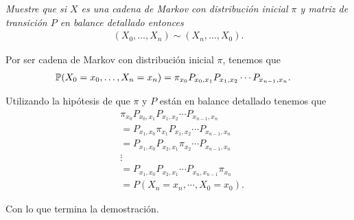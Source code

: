 \emph{
    Muestre que si $X$ es una cadena de Markov con distribución inicial $\pi$ y matriz de transición $P$ en balance detallado entonces
    \begin{align}
            (X_0, \dots, X_n) \sim (X_n, \dots, X_0).
    \end{align}
}

\afterstatement\pn

Por ser cadena de Markov con distribución inicial $\pi$, tenemos que
\begin{align}
        \P(X_0 = x_0, \dots, X_n = x_n) &=  \pi_{x_0} P_{x_0, x_1} P_{x_1, x_2} \cdots P_{x_{n-1}, x_{n}}.
\end{align}\pn

Utilizando la hipótesis de que $\pi$ y $P$ están en balance detallado tenemos que
\begin{align}
    &   \pi_{x_0} P_{x_0, x_1} P_{x_1, x_2} \cdots P_{x_{n-1}, x_{n}}   \\
    &=  P_{x_1, x_0} \pi_{x_1} P_{x_1, x_2} \cdots P_{x_{n-1}, x_{n}}   \\
    &=  P_{x_1, x_0} P_{x_2, x_1} \pi_{x_2} \cdots P_{x_{n-1}, x_{n}}   \\
    &\vdots                                                             \\
    &=  P_{x_1, x_0} P_{x_2, x_1} \cdots P_{x_{n}, x_{n-1}} \pi_{x_n}   \\
    &= P(X_n = x_n, \cdots, X_0 = x_0).
\end{align}\pn

Con lo que termina la demostración.